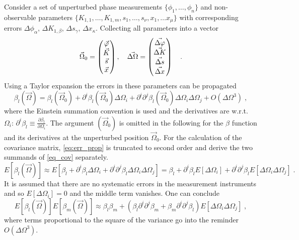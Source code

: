 Consider a set of unperturbed phase measurements $ \{\phi_1, \ldots, \phi_n\} $ and non-observable  parameters $  \{ K_{1,1} , \ldots , K_{1,m}, s_1, \ldots, s_{\nu}, x_1, \ldots x_{\mu} \} $ with corresponding errors $ \Delta \phi_\alpha,\, \Delta K_{1,\beta}, \,\Delta s_\gamma,\, \Delta x_\kappa  $.
Collecting all parameters into a vector
%
\begin{equation}
\vec{\Omega}_0 =
\begin{pmatrix}
\vec{\varphi}\\
\vec{K}\\
\vec{s}\\
\vec{x}
\end{pmatrix},\quad
\vec{\Delta \Omega} = 
\begin{pmatrix}
\vec{\Delta\varphi}\\
\vec{\Delta K}\\
\vec{\Delta s}\\
\vec{\Delta x}
\end{pmatrix}
\quad .
\end{equation}
%
Using a Taylor expansion the errors in these parameters can be propagated
%
\begin{equation}
\beta_l (\vec{\Omega}) = \beta_l(\vec{\Omega}_0) + \partial^i\beta_l(\vec{\Omega}_0)\Delta\Omega_i +  \partial^i\partial^j\beta_l(\vec{\Omega}_0)\Delta\Omega_i\Delta\Omega_j + O(\Delta\Omega^3)\;,
\label{eq:err_prop}
\end{equation}
%
where the Einstein summation convention is used and the derivatives are w.r.t. $ \Omega_i $: $ \partial^i\beta_l \equiv \frac{\partial \beta_l}{\partial \Omega_i} $.
The argument $ (\vec{\Omega}_0) $ is omitted in the following for the $ \beta $ function and its derivatives at the unperturbed position $ \vec{\Omega}_0 $. For the calculation of the covariance matrix,
\eqref{eq:err_prop} is truncated to second order and derive the two summands of \eqref{eq_cov} separately.
%
\begin{equation}
E[\beta_l(\vec{\Omega})] \approx E\left[   
\beta_l + \partial^i\beta_l\Delta\Omega_i +  \partial^i\partial^j\beta_l\Delta\Omega_i\Delta\Omega_j 
\right] =
\beta_l + \partial^i\beta_l E[\Delta\Omega_i] +  \partial^i\partial^j\beta_l E\left[\Delta\Omega_i\Delta\Omega_j \right]\;.
\end{equation}
%
 It is assumed that there are no systematic errors in the measurement instruments and so $ {E}[{\Delta\Omega_i}] =0$ and the middle term vanishes.
One can conclude
%
\begin{equation}
E[\beta_l(\vec{\Omega})]E[\beta_m(\vec{\Omega})] \approx \beta_l\beta_m +
 \left(\beta_l\partial^i\partial^j\beta_m +
 \beta_m\partial^i\partial^j\beta_l\right) E\left[\Delta\Omega_i\Delta\Omega_j \right]\;,
 \label{eq:Eb_Eb}
\end{equation}
%
 where terms proportional to the square of the variance go into the reminder $ O(\Delta\Omega^3) $.

